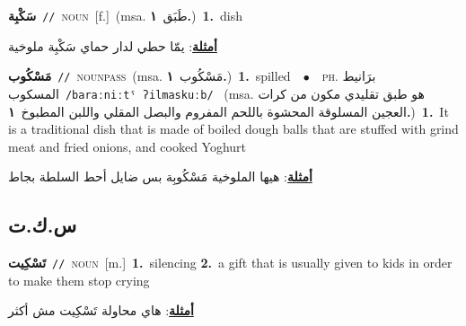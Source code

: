 \documentclass[10pt,a4paper,twoside]{article} %
\begin{document}
\begin{multicols}{2}
{\setlength\topsep{0pt}\textbf{\foreignlanguage{arabic}{سَكْبِة}}\ {\color{gray}\texttt{//}\color{black}}\ \textsc{noun}\ [f.]\ \color{gray}(msa. \foreignlanguage{arabic}{طَبَق}~\foreignlanguage{arabic}{\textbf{١.}})\color{black}\ \textbf{1.}~dish\  \begin{flushright}\color{gray}\foreignlanguage{arabic}{\textbf{\underline{\foreignlanguage{arabic}{أمثلة}}}: يمّا حطي لدار حماي سَكْبِة ملوخية}\end{flushright}\color{black}} \vspace{2mm}

{\setlength\topsep{0pt}\textbf{\foreignlanguage{arabic}{مَسْكُوب}}\ {\color{gray}\texttt{//}\color{black}}\ \textsc{noun\textunderscore pass}\ \color{gray}(msa. \foreignlanguage{arabic}{مَسْكُوب}~\foreignlanguage{arabic}{\textbf{١.}})\color{black}\ \textbf{1.}~spilled\ \ $\bullet$\ \ \textsc{ph.} \color{gray} \foreignlanguage{arabic}{برَانيط المسكوب}\color{black}\ {\color{gray}\texttt{/{\sffamily baraːniːtˤ ʔilmaskuːb}/}\color{black}}\ \color{gray} (msa. \foreignlanguage{arabic}{هو طبق تقليدي مكون من كرات العجين المسلوقة المحشوة باللحم المفروم والبصل المقلي واللبن المطبوخ}~\foreignlanguage{arabic}{\textbf{١.}})\color{black}\ \textbf{1.}~It is a traditional dish that is made of boiled dough balls that are stuffed with grind meat and fried onions, and cooked Yoghurt\  \begin{flushright}\color{gray}\foreignlanguage{arabic}{\textbf{\underline{\foreignlanguage{arabic}{أمثلة}}}: هيها الملوخية مَسْكُوبِة بس ضايل أحط السلطة بجاط}\end{flushright}\color{black}} \vspace{2mm}

\vspace{-3mm}
\subsection*{\color{blue}\foreignlanguage{arabic}{س.ك.ت}\color{blue}{}} 

{\setlength\topsep{0pt}\textbf{\foreignlanguage{arabic}{تَسْكِيت}}\ {\color{gray}\texttt{//}\color{black}}\ \textsc{noun}\ [m.]\ \textbf{1.}~silencing  \textbf{2.}~a gift that is usually given to kids in order to make them stop crying\  \begin{flushright}\color{gray}\foreignlanguage{arabic}{\textbf{\underline{\foreignlanguage{arabic}{أمثلة}}}: هاي محاولة تَسْكِيت مش أكثر}\end{flushright}\color{black}} \vspace{2mm}


\end{multicols}
\end{document}
